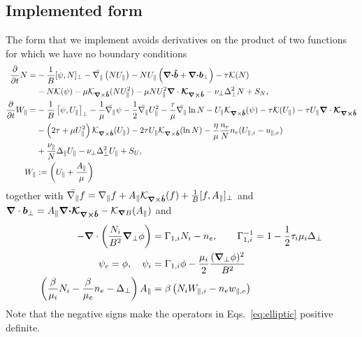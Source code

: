 \subsection{Implemented form}
The form that we implement avoids derivatives on the product of
two functions for which we have no boundary conditions
\begin{subequations}
    \begin{align}
    \frac{\partial}{\partial t} N =&
        - \frac{1}{B}[\psi, N]_{\perp}%
        - \bar \npar \left( NU_\parallel\right)
        - NU_\parallel\left(\vec \nc\bhat+\vec \nc{\vec b}_\perp\right)
        - \tau \mathcal K(N) \nonumber \\&
        - N \mathcal K(\psi)
        -\mu \mathcal K_{\vn\times\bhat}(NU_\parallel^2)
        -\mu NU_\parallel^2\nc \vec{ \mathcal K_{\vn\times\bhat}}
        - \nu_\perp\Delta_\perp^2 N + S_N, \\
    \frac{\partial}{\partial t} W_\parallel =&
        - \frac{1}{B}\left[\psi, U_\parallel\right]_{\perp}%
        - \frac{1}{\mu} \bar \npar \psi%
        - \frac{1}{2}\bar \npar U_\parallel^2
        -\frac{\tau}{\mu} \bar \npar \ln N
        - U_\parallel\mathcal K_{\vn\times\bhat}(\psi)
        - \tau \mathcal K(U_\parallel)
        -\tau U_\parallel\nc\vec{ \mathcal K_{\vn\times\bhat}}\nonumber\\&
        - \left(2\tau + {\mu}U_\parallel^2\right) \mathcal K_{\vn\times\bhat} (U_\parallel)
        -2\tau U_\parallel\mathcal K_{\vn\times\bhat}(\ln N)
        - \frac{\eta}{\mu} \frac{n_e}{N}n_e(U_{\parallel,i} - u_{\parallel,e})
 \nonumber\\&
        + \frac{\nu_\parallel}{N} \Delta_\parallel U_\parallel - \nu_\perp\Delta_\perp^2 U_\parallel
                + S_U,
        \label{eq:EgyrofluidU} \\
        W_\parallel&:= \left( U_\parallel + \frac{A_\parallel}{\mu}\right)
    \end{align}
    \label{eq:Egyrofluid}
\end{subequations}
together with
$\bar{\nabla_\parallel} f = \nabla_\parallel f + A_\parallel \mathcal K_{{\boldsymbol{\nabla}}\times\bm{\hat{b}}}(f) + \frac{1}{B}[ f, A_\parallel]_\perp$
and ${\boldsymbol{\nabla}}\cdot { {\boldsymbol{b}}}_\perp = A_\parallel {\boldsymbol{{\boldsymbol{\nabla}}\cdot}}{\boldsymbol{ \mathcal{ K}_{{\boldsymbol{\nabla}}\times\bm{\hat{b}}}}} - \mathcal K_{{\boldsymbol{\nabla}} B}(A_\parallel) $
and
\begin{subequations} \label{eq:elliptic}
  \begin{align}
    -{\boldsymbol{\nabla}}\cdot\left( \frac{N_i}{B^2}{\boldsymbol{\nabla}}_{\perp} \phi \right) &= \Gamma_{1,i} N_i - n_e, \quad\quad
    \Gamma_{1,i}^{-1} = 1-\frac{1}{2}\tau_i\mu_i \Delta_\perp \\
    \psi_e = \phi, \quad \psi_i &= \Gamma_{1,i}\phi -\frac{\mu_i}{2}\frac{({\boldsymbol{\nabla}}_{\perp}\phi)^2}{B^2} \\
    \left(\frac{\beta}{\mu_i}N_i - \frac{\beta}{\mu_e}n_e-\Delta_\perp\right)
    A_\parallel &= \beta\left(N_iW_{\parallel,i}-n_e w_{\parallel,e}\right)
  \end{align}
\end{subequations}
Note that the negative signs make the operators in Eqs.~\eqref{eq:elliptic} positive definite.

